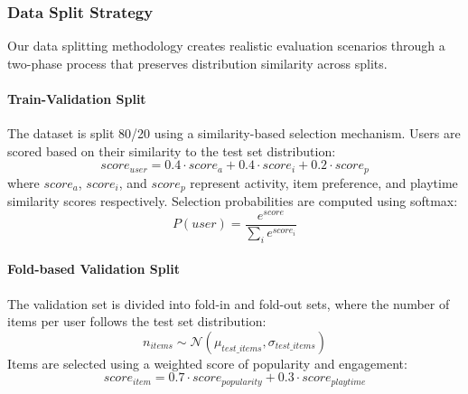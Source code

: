 \documentclass[conference,compsoc]{IEEEtran}
\begin{document}
\subsubsection{Data Split Strategy}
Our data splitting methodology creates realistic evaluation scenarios through a two-phase process that preserves distribution similarity across splits.
\paragraph{\textbf{Train-Validation Split}}
The dataset is split 80/20 using a similarity-based selection mechanism. Users are scored based on their similarity to the test set distribution:
\begin{equation}
score_{user} = 0.4 \cdot score_a + 0.4 \cdot score_i + 0.2 \cdot score_p
\end{equation}
where $score_a$, $score_i$, and $score_p$ represent activity, item preference, and playtime similarity scores respectively. Selection probabilities are computed using softmax:
\begin{equation}
P(user) = \frac{e^{score}}{\sum_i e^{score_i}}
\end{equation}
\paragraph{\textbf{Fold-based Validation Split}}
The validation set is divided into fold-in and fold-out sets, where the number of items per user follows the test set distribution:
\begin{equation}
n_{items} \sim \mathcal{N}(\mu_{test\_items}, \sigma_{test\_items})
\end{equation}
Items are selected using a weighted score of popularity and engagement:
\begin{equation}
score_{item} = 0.7 \cdot score_{popularity} + 0.3 \cdot score_{playtime}
\end{equation}
\end{document}
